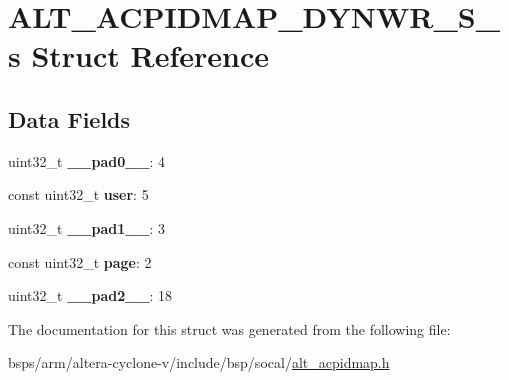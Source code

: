 \hypertarget{structALT__ACPIDMAP__DYNWR__S__s}{}\section{A\+L\+T\+\_\+\+A\+C\+P\+I\+D\+M\+A\+P\+\_\+\+D\+Y\+N\+W\+R\+\_\+\+S\+\_\+s Struct Reference}
\label{structALT__ACPIDMAP__DYNWR__S__s}
\subsection*{Data Fields}
\begin{DoxyCompactItemize}
\item 
\mbox{\label{structALT__ACPIDMAP__DYNWR__S__s_a8e51f0d24cac3375505ed98a4a0e4929}} 
uint32\+\_\+t {\bfseries \+\_\+\+\_\+pad0\+\_\+\+\_\+}\+: 4
\item 
\mbox{\label{structALT__ACPIDMAP__DYNWR__S__s_a5c7e92bcb7cccb3c12684c03ed67955e}} 
const uint32\+\_\+t {\bfseries user}\+: 5
\item 
\mbox{\label{structALT__ACPIDMAP__DYNWR__S__s_a5222944c1f1fc83ccb3a8d8fd931e52f}} 
uint32\+\_\+t {\bfseries \+\_\+\+\_\+pad1\+\_\+\+\_\+}\+: 3
\item 
\mbox{\label{structALT__ACPIDMAP__DYNWR__S__s_a4f8a8dbec964dcda0b5c4b3334124512}} 
const uint32\+\_\+t {\bfseries page}\+: 2
\item 
\mbox{\label{structALT__ACPIDMAP__DYNWR__S__s_a59ab6156fb65cda1be68b649552c77e7}} 
uint32\+\_\+t {\bfseries \+\_\+\+\_\+pad2\+\_\+\+\_\+}\+: 18
\end{DoxyCompactItemize}


The documentation for this struct was generated from the following file\+:\begin{DoxyCompactItemize}
\item 
bsps/arm/altera-\/cyclone-\/v/include/bsp/socal/\mbox{\hyperlink{alt__acpidmap_8h}{alt\+\_\+acpidmap.\+h}}\end{DoxyCompactItemize}
